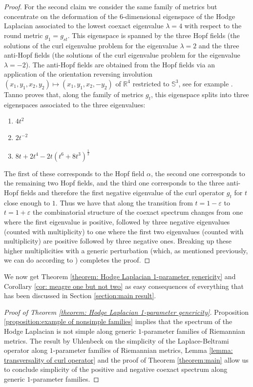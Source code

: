 \begin{proof}
For the second claim we consider the same family of metrics but concentrate on the deformation of the $6$-dimensional eigenspace of the Hodge Laplacian associated to the lowest coexact eigenvalue $\lambda=4$ with respect to the round metric $g_1=g_{st}$. This eigenspace is spanned by the three Hopf fields (the solutions of the curl eigenvalue problem for the eigenvalue $\lambda = 2$ and the three anti-Hopf fields (the solutions of the curl eigenvalue problem for the eigenvalue $\lambda=-2$). The anti-Hopf fields are obtained from the Hopf fields via an application of the orientation reversing involution $(x_1,y_1,x_2,y_2)\mapsto (x_1,y_1,x_2,-y_2)$ of $\mathbb R^4$ restricted to $\mathbb{S}^3$, see for example \cite[Remark 6]{PeraltaSlobodeanu2021}.
Tanno proves \cite[Theorem 4.1]{Tanno1983} that, along the family of metrics $g_t$, this eigenspace splits into three eigenspaces associated to the three eigenvalues:
\begin{enumerate}
    \item $4t^2$
    \item $2t^{-2}$
    \item $8t + 2t^4 - 2t(t^6+8t^3)^{\frac{1}{2}} $
\end{enumerate}
The first of these corresponds to the Hopf field $\alpha$, the second one corresponds to the remaining two Hopf fields, and the third one corresponds to the three anti-Hopf fields and therefore the first negative eigenvalue of the curl operator $g_t$ for $t$ close enough to $1$. Thus we have that along the transition from $t=1-\varepsilon$ to $t=1+\varepsilon$ the combinatorial structure of the coexact spectrum changes from one where the first eigenvalue is positive, followed by three negative eigenvalues (counted with multiplicity) to one where the first two eigenvalues (counted with multiplicity) are positive followed by three negative ones. Breaking up these higher multiplicities with a generic perturbation (which, as mentioned previously, we can do according to \cite[Theorem 1.1.]{Enciso2012}) completes the proof.
\end{proof}

We now get Theorem \ref{theorem: Hodge Laplacian 1-parameter genericity} and Corollary \ref{cor: meagre one but not two} as easy consequences of everything that has been discussed in Section \ref{section:main result}.

\begin{proof}[Proof of Theorem \ref{theorem: Hodge Laplacian 1-parameter genericity}]
    Proposition \ref{proposition:example of nonsimple families} implies that the spectrum of the Hodge Laplacian is not simple along generic $1$-parameter families of Riemannian metrics. The result by Uhlenbeck on the simplicity of the Laplace-Beltrami operator along $1$-parameter families of Riemannian metrics, Lemma \ref{lemma: transversality of curl operator} and the proof of Theorem \ref{theorem:main} allow us to conclude simplicity of the positive and negative coexact spectrum along generic $1$-parameter families.
\end{proof}

